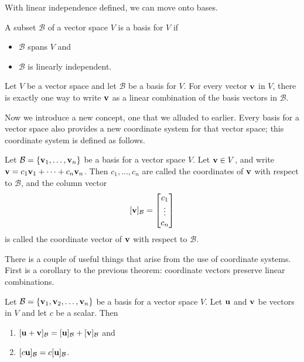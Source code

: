 \documentclass[../m073main.tex]{subfiles}
\begin{document}
With linear independence defined, we can move onto bases.

\begin{definition}[Basis]
	A subset $\mathcal{B}$ of a vector space $V$ is a basis for $V$ if
	\begin{itemize}[topsep=0pt]
		\item $\mathcal{B}$ spans $V$ and
		\item $\mathcal{B}$ is linearly independent.
	\end{itemize}
\end{definition}

\begin{theorem}
	Let $V$ be a vector space and let $\mathcal{B}$ be a basis for $V$.
	For every vector $\mathbf{v}$ in $V$, there is exactly one way to write $\mathbf{v}$ as a linear combination of the basis vectors in $\mathcal{B}$.
\end{theorem}

Now we introduce a new concept, one that we alluded to earlier.
Every basis for a vector space also provides a new coordinate system for that vector space; this coordinate system is defined as follows.

\begin{definition}
	Let $\mathcal{B} = \{\mathbf{v}_1, \ldots, \mathbf{v}_n\}$ be a basis for a vector space $V$.
	Let $\mathbf{v} \in V$, and write $\mathbf{v} = c_1 \mathbf{v}_1 + \cdots + c_n \mathbf{v}_n$.
	Then $c_1, \ldots, c_n$ are called the coordinates of $\mathbf{v}$ with respect to $\mathcal{B}$, and the column vector
	\[ [\mathbf{v}]_{\mathcal{B}} = \begin{bmatrix} c_1 \\ \vdots \\ c_n \end{bmatrix} \]
	is called the coordinate vector of $\mathbf{v}$ with respect to $\mathcal{B}$.
\end{definition}

There is a couple of useful things that arise from the use of coordinate systems.
First is a corollary to the previous theorem: coordinate vectors preserve linear combinations.

\begin{theorem}
	Let $\mathcal{B} = \{\mathbf{v}_1, \mathbf{v}_2, \ldots, \mathbf{v}_n\}$ be a basis for a vector space $V$.
	Let $\mathbf{u}$ and $\mathbf{v}$ be vectors in $V$ and let $c$ be a scalar.
	Then
	\begin{multicols}{2}
		\begin{enumerate}[label=(\alph*)]
			\item $[\mathbf{u} + \mathbf{v}]_{\mathcal{B}} = [\mathbf{u}]_{\mathcal{B}} + [\mathbf{v}]_{\mathcal{B}}$ and
			\item $[c \mathbf{u}]_{\mathcal{B}} = c[\mathbf{u}]_{\mathcal{B}}$.
		\end{enumerate}
	\end{multicols}
	\vspace{6pt}
\end{theorem}
\end{document}
